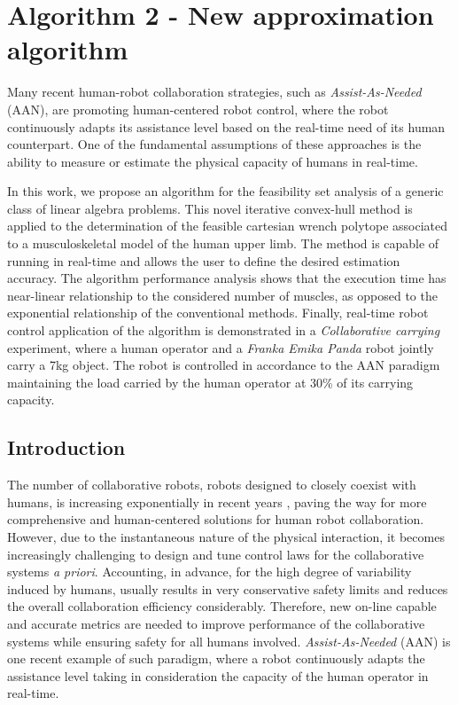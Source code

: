 

\chapter{Algorithm 2 - New approximation algorithm}

Many recent human-robot collaboration strategies, such as \textit{Assist-As-Needed} (AAN), are promoting human-centered robot control, where the robot continuously adapts its assistance level based on the real-time need of its human counterpart.
One of the fundamental assumptions of these approaches is the ability to measure or estimate the physical capacity of humans in real-time.

In this work, we propose an algorithm for the feasibility set analysis of a generic class of linear algebra problems. This novel iterative convex-hull method is applied to the determination of the feasible cartesian wrench polytope associated to a musculoskeletal model of the human upper limb. The method is capable of running in real-time and allows the user to define the desired estimation accuracy.  
The algorithm performance analysis shows that the execution time has near-linear relationship to the considered number of muscles, as opposed to the exponential relationship of the conventional methods. Finally, real-time robot control application of the algorithm is demonstrated in a \textit{Collaborative carrying} experiment, where a human operator and a \textit{Franka Emika Panda} robot jointly carry a 7kg object. The robot is controlled in accordance to the AAN paradigm maintaining the load carried by the human operator at 30\% of its carrying capacity.

\section{Introduction}

The number of collaborative robots, robots designed to closely coexist with humans, is increasing exponentially in recent years \cite{ajoudani2018progress}, paving the way for more comprehensive and human-centered solutions for human robot collaboration. However, due to the instantaneous nature of the physical interaction, it becomes increasingly challenging to design and tune control laws for the collaborative systems \textit{a priori}. Accounting, in advance, for the high degree of variability induced by humans, usually results in very conservative safety limits and reduces the overall collaboration efficiency considerably. Therefore, new on-line capable and accurate metrics are needed to improve performance of the collaborative systems while ensuring safety for all humans involved. \textit{Assist-As-Needed} (AAN)\cite{carmichael2013admittance} is one recent example of such paradigm, where a robot continuously adapts the assistance level taking in consideration the capacity of the human operator in real-time.

